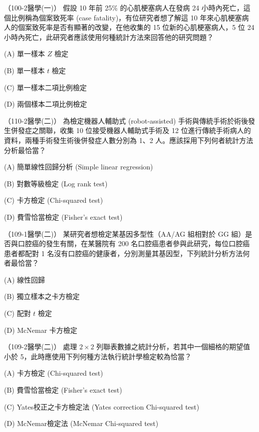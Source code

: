    \begin{docexam}{（100-2醫學(一)）}
        假設 10 年前 25\% 的心肌梗塞病人在發病 24 小時內死亡，這個比例稱為個案致死率 (case fatality)，有位研究者想了解這 10 年來心肌梗塞病人的個案致死率是否有顯著的改變，在他收集的 15 位新的心肌梗塞病人，5 位 24 小時內死亡，此研究者應該使用何種統計方法來回答他的研究問題？
        
        (A) 單一樣本 $Z$ 檢定
        
        (B) 單一樣本 $t$ 檢定

        (C) 單一樣本二項比例檢定
 
        (D) 兩個樣本二項比例檢定
    \end{docexam}
    
    \begin{docexam}{（110-2醫學(二)）}
        為檢定機器人輔助式 (robot-assisted) 手術與傳統手術於術後發生併發症之關聯，收集 10 位接受機器人輔助式手術及 12 位進行傳統手術病人的資料，兩種手術發生術後併發症人數分別為 1、2 人。應該採用下列何者統計方法分析最恰當？
        
        (A) 簡單線性回歸分析 (Simple linear regression)
        
        (B) 對數等級檢定 (Log rank test)

        (C) 卡方檢定 (Chi-squared test)
 
        (D) 費雪恰當檢定 (Fisher's exact test)
    \end{docexam}
    
    \begin{docexam}{（109-1醫學(二)）}
        某研究者想檢定某基因多型性（AA/AG 組相對於 GG 組）是否與口腔癌的發生有關，在某醫院有 200 名口腔癌患者參與此研究，每位口腔癌患者都配對 1 名沒有口腔癌的健康者，分別測量其基因型，下列統計分析方法何者最恰當？
        
        (A) 線性回歸
        
        (B) 獨立樣本之卡方檢定

        (C) 配對 $t$ 檢定
 
        (D) McNemar 卡方檢定
    \end{docexam}
    
    \begin{docexam}{（109-2醫學(二)）}
        處理 $2 \times 2$ 列聯表數據之統計分析，若其中一個細格的期望值小於 5，此時應使用下列何種方法執行統計學檢定較為恰當？
        
        (A) 卡方檢定 (Chi-squared test)
        
        (B) 費雪恰當檢定 (Fisher's exact test)

        (C) Yates校正之卡方檢定法 (Yates correction Chi-squared test)
 
        (D) McNemar檢定法 (McNemar Chi-squared test)
    \end{docexam}
    
